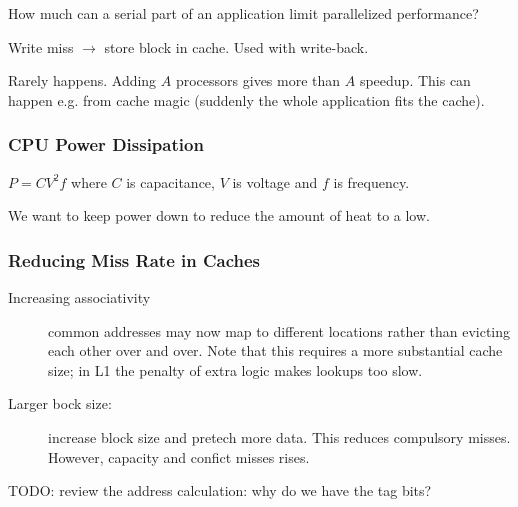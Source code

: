 \begin{definition}
    How much can a serial part of an application limit parallelized performance?
\end{definition}


\begin{definition}
    Write miss $\rightarrow$ store block in cache. Used with write-back.
\end{definition}



\begin{definition}
   Rarely happens. Adding $A$ processors gives more than $A$ speedup. This can happen e.g. from cache magic (suddenly the whole application fits the cache). 
\end{definition}


\subsubsection{CPU Power Dissipation}\label{sec:powerdissipation}
    $P = CV^{2}f$
    where $C$ is capacitance, $V$ is voltage and $f$ is frequency.

    We want to keep power down to reduce the amount of heat to a low.

\subsubsection{Reducing Miss Rate in Caches}
\begin{description}
    \item[Increasing associativity] common addresses may now map to different locations rather than evicting each other over and over. Note that this requires 
    a more substantial cache size; in L1 the penalty of extra logic makes lookups
    too slow.
    \item[Larger bock size:] increase block size and pretech more data. This
    reduces compulsory misses. However, capacity and confict misses rises.
\end{description}

TODO: review the address calculation: why do we have the tag bits?
